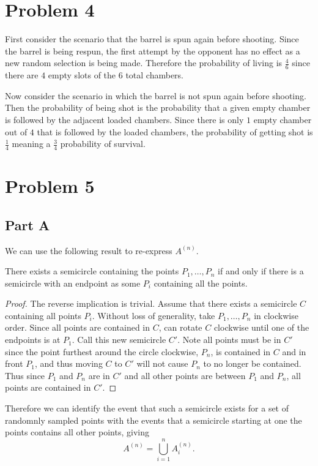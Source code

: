 \documentclass{eeleyes}
\begin{document}
\section*{Problem 4}
First consider the scenario that the barrel is spun again before shooting. Since the barrel is being respun, the first attempt by the opponent has no effect as a new random selection is being made. Therefore the probability of living is $\frac{4}{6}$ since there are $4$ empty slots of the $6$ total chambers.

Now consider the scenario in which the barrel is not spun again before shooting. Then the probability of being shot is the probability that a given empty chamber is followed by the adjacent loaded chambers. Since there is only $1$ empty chamber out of $4$ that is followed by the loaded chambers, the probability of getting shot is $\frac{1}{4}$ meaning a $\frac{3}{4}$ probability of survival.

\section*{Problem 5}
\subsection*{Part A}

We can use the following result to re-express $A^{(n)}$.

\begin{theorem}[]
    There exists a semicircle containing the points $P_1, \ldots, P_n$ if and only if there is a semicircle with an endpoint as some $P_i$ containing all the points.
\end{theorem}

\begin{proof}
    The reverse implication is trivial. Assume that there exists a semicircle $C$ containing all points $P_i$. Without loss of generality, take $P_1, \ldots, P_n$ in clockwise order. Since all points are contained in $C$, can rotate $C$ clockwise until one of the endpoints is at $P_1$. Call this new semicircle $C'$. Note all points must be in $C'$ since the point furthest around the circle clockwise, $P_n$, is contained in $C$ and in front $P_1$, and thus moving $C$ to $C'$ will not cause $P_n$ to no longer be contained. Thus since $P_1$ and $P_n$ are in $C'$ and all other points are between $P_1$ and $P_n$, all points are contained in $C'$.
\end{proof}
Therefore we can identify the event that such a semicircle exists for a set of randomnly sampled points with the events that a semicircle starting at one the points contains all other points, giving
\[
    A^{(n)} = \bigcup_{i = 1}^n A_{i}^{(n)}
.\]
\end{document}
